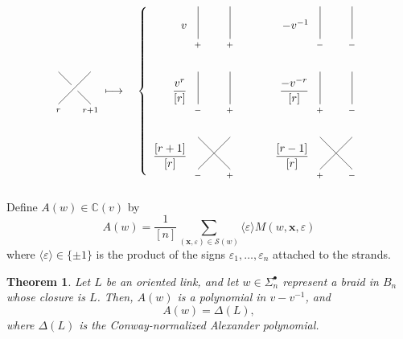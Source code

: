 \documentclass [12pt, letterpaper, oneside] {amsart}
\newcommand \e {\varepsilon}
\newcommand \mc {\mathcal}
\newcommand \mB {\mathbb}
\newcommand \mb {\mathbf}
\theoremstyle {plain}
\newtheorem {thm} [subsection] {Theorem}
\begin{document}
\begin {equation} \label {scalars}
\vcenter{
\xy
(0,0);(10,10)**@{-},
(10,0);(6,4)**@{-},
(4,6);(0,10)**@{-},
(0,-2)*={_r},
(10,-2)*={_{r+1}},
\endxy
} \quad \longmapsto \quad \left \{
\begin {array} {r c r}
v \quad \vcenter{
\xy
(0,-2)*={_+},
(0,0);(0,10)**@{-},
(10,-2)*={_+},
(10,0);(10,10)**@{-}
\endxy
} & \qquad &
-v^{-1} \quad \vcenter{
\xy
(0,-2)*={_-},
(0,0);(0,10)**@{-},
(10,-2)*={_-},
(10,0);(10,10)**@{-}
\endxy
} \\ & & \\ & & \\
\dfrac {v^r} {[r]} \quad \vcenter{
\xy
(0,-2)*={_-},
(0,0);(0,10)**@{-},
(10,-2)*={_+},
(10,0);(10,10)**@{-}
\endxy
} & \qquad &
\dfrac {-v^{-r}} {[r]} \quad \vcenter{
\xy
(0,-2)*={_+},
(0,0);(0,10)**@{-},
(10,-2)*={_-},
(10,0);(10,10)**@{-}
\endxy
} \\ & & \\ & & \\
\dfrac {[r+1]} {[r]} \quad \vcenter{
\xy
(0,-2)*={_-},
(0,0);(10,10)**@{-},
(10,-2)*={_+},
(10,0);(0,10)**@{-}
\endxy
} & &
\dfrac {[r-1]} {[r]} \quad \vcenter{
\xy
(0,-2)*={_+},
(0,0);(10,10)**@{-},
(10,-2)*={_-},
(10,0);(0,10)**@{-}
\endxy
}
\end {array}
\right.
\end {equation} \\
Define $A(w) \in \mB{C}(v)$ by
\begin {equation} \label {state-sum}
A(w)=\frac 1 {[n]} \sum_{(\mb{x}, \e) \in \mc{S}(w)} \langle \e \rangle M(w,\mb{x},\e)
\end {equation}
where $\langle \e \rangle \in \{ \pm 1 \}$ is the product of the signs $\e_1, \ldots, \e_n$ attached to the strands.
\begin {thm} \label {main thm}
Let $L$ be an oriented link, and let $w \in \Sigma_n^\bullet$ 
represent a braid in $B_n$ whose closure is $L$.  Then, $A(w)$ is a polynomial in $v-v^{-1}$, and
\[ A(w) = \Delta(L), \] where $\Delta(L)$ 
is the Conway-normalized Alexander polynomial.
\end {thm}
\end{document}

